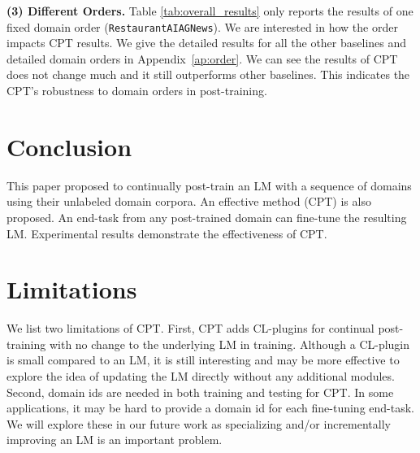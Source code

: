 \documentclass[11pt]{article}
\begin{document}
\textbf{(3) Different Orders.} Table \ref{tab:overall_results} only reports the results of one fixed domain order (\texttt{Restaurant}\texttt{AI}\texttt{AGNews}). We are interested in how the order impacts CPT results. We give the detailed results for all the other baselines and detailed domain orders in Appendix~\ref{ap:order}. We can see the results of CPT does not change much and it still outperforms other baselines. This indicates the CPT's robustness to domain orders in  post-training. 

















\begin{table}[]
\centering
{}
\caption{Ablation experiment results. }
\label{tab:ablation_results}
\vspace{-6mm}
\end{table}




\section{Conclusion}
{\color{black}This paper proposed to continually post-train an LM with a sequence of domains using their unlabeled domain corpora. An effective method (CPT) is also proposed. An end-task from any post-trained domain can fine-tune the resulting LM. Experimental results demonstrate the effectiveness of CPT. } 


\section{Limitations}
{\color{black}We list two limitations of CPT. First, CPT adds CL-plugins for continual post-training with no change to the underlying LM in training. Although a CL-plugin is small compared to an LM, it is still interesting and may be more effective to explore the idea of updating the LM directly without any additional modules. Second, domain ids are needed in both training and testing for CPT. In some applications, it may be hard to provide a domain id for each fine-tuning end-task. We will explore these in our future work as specializing and/or incrementally improving an LM is an important problem.} 
\end{document}
